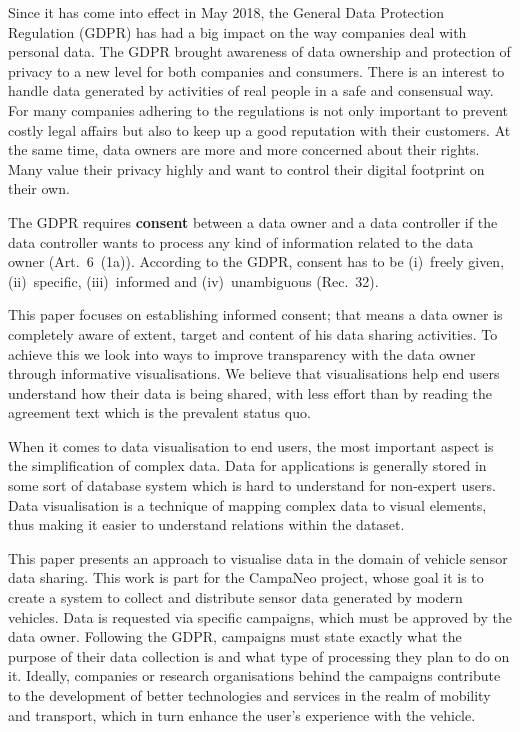 \documentclass[../paper.tex]{subfiles}
\begin{document}
  Since it has come into effect in May 2018, the General Data Protection
  Regulation (GDPR) has had a big impact on the way companies deal with
  personal data. The GDPR brought awareness of data ownership and protection
  of privacy to a new level for both companies and consumers. There is an
  interest to handle data generated by activities of real people in a safe and
  consensual way. For many companies adhering to the regulations is not only
  important to prevent costly legal affairs but also to keep up a good
  reputation with their customers. At the same time, data owners are more and
  more concerned about their rights. Many value their privacy highly and want
  to control their digital footprint on their own.

  The GDPR requires \textbf{consent} between a data owner and a data controller
  if the data controller wants to process any kind of information related to
  the data owner (Art.~6~(1a)). According to the GDPR, consent has to be
  (i)~freely given, (ii)~specific, (iii)~informed and (iv)~unambiguous (Rec.~32).

  This paper focuses on establishing informed consent; that means a data owner
  is completely aware of extent, target and content of his data sharing
  activities. To achieve this we look into ways to improve transparency with
  the data owner through informative visualisations. We believe that
  visualisations help end users understand how their data is being shared,
  with less effort than by reading the agreement text which is the prevalent
  status quo.

  When it comes to data visualisation to end users, the most important aspect
  is the simplification of complex data. %
  Data for applications is generally stored in some sort of database system
  which is hard to understand for non-expert users. Data visualisation is a
  technique of mapping complex data to visual elements, thus making it easier
  to understand relations within the dataset.

  This paper presents an approach to visualise data in the domain of vehicle
  sensor data sharing. This work is part for the CampaNeo project, whose goal
  it is to create a system to collect and distribute sensor data generated by
  modern vehicles. Data is requested via specific campaigns, which must be
  approved by the data owner. Following the GDPR, campaigns must state exactly
  what the purpose of their data collection is and what type of processing they
  plan to do on it. Ideally, companies or research organisations behind the
  campaigns contribute to the development of better technologies and services
  in the realm of mobility and transport, which in turn enhance the user’s
  experience with the vehicle.
\end{document}
